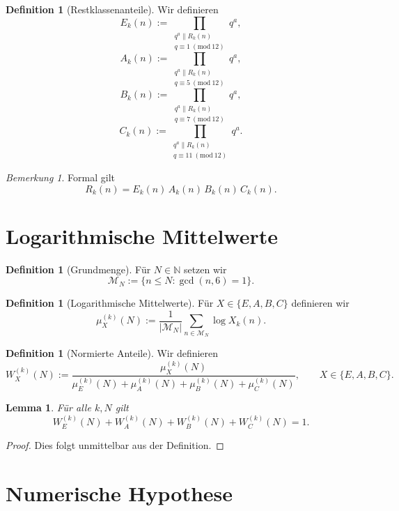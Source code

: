 \documentclass[11pt,a4paper]{article}
\newtheorem{lemma}[satz]{Lemma}
\theoremstyle{definition}
\newtheorem{definition}[satz]{Definition}
\theoremstyle{remark}
\newtheorem{bemerkung}[satz]{Bemerkung}
\begin{document}
	\begin{definition}[Restklassenanteile]
		Wir definieren
		\[
		E_k(n):=\prod_{\substack{q^a\parallel R_k(n)\\ q\equiv 1\ (\mathrm{mod}\ 12)}} q^a,
		\]
		\[
		A_k(n):=\prod_{\substack{q^a\parallel R_k(n)\\ q\equiv 5\ (\mathrm{mod}\ 12)}} q^a,
		\]
		\[
		B_k(n):=\prod_{\substack{q^a\parallel R_k(n)\\ q\equiv 7\ (\mathrm{mod}\ 12)}} q^a,
		\]
		\[
		C_k(n):=\prod_{\substack{q^a\parallel R_k(n)\\ q\equiv 11\ (\mathrm{mod}\ 12)}} q^a.
		\]
	\end{definition}
	
	\begin{bemerkung}
		Formal gilt
		\[
		R_k(n)=E_k(n)\,A_k(n)\,B_k(n)\,C_k(n).
		\]
	\end{bemerkung}
	
	\section{Logarithmische Mittelwerte}
	
	\begin{definition}[Grundmenge]
		Für \(N\in\mathbb N\) setzen wir
		\[
		\mathcal M_N:=\{n\le N:\gcd(n,6)=1\}.
		\]
	\end{definition}
	
	\begin{definition}[Logarithmische Mittelwerte]
		Für \(X\in\{E,A,B,C\}\) definieren wir
		\[
		\mu_X^{(k)}(N):=
		\frac{1}{|\mathcal M_N|}
		\sum_{n\in\mathcal M_N}\log X_k(n).
		\]
	\end{definition}
	
	\begin{definition}[Normierte Anteile]
		Wir definieren
		\[
		W_X^{(k)}(N):=
		\frac{\mu_X^{(k)}(N)}
		{\mu_E^{(k)}(N)+\mu_A^{(k)}(N)+\mu_B^{(k)}(N)+\mu_C^{(k)}(N)},
		\qquad X\in\{E,A,B,C\}.
		\]
	\end{definition}
	
	\begin{lemma}
		Für alle \(k,N\) gilt
		\[
		W_E^{(k)}(N)+W_A^{(k)}(N)+W_B^{(k)}(N)+W_C^{(k)}(N)=1.
		\]
	\end{lemma}
	
	\begin{proof}
		Dies folgt unmittelbar aus der Definition.
	\end{proof}
	
	\section{Numerische Hypothese}
	
\end{document}
